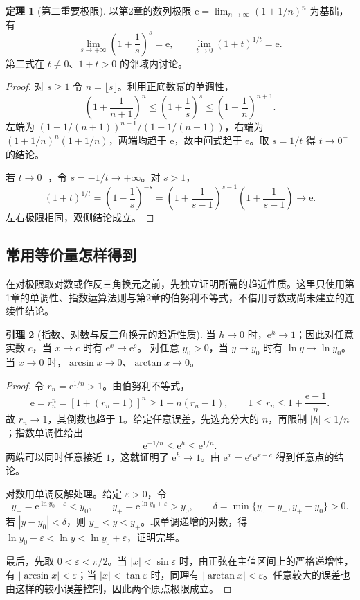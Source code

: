 \documentclass[UTF8,fontset=fandol,12pt,oneside,openany]{ctexrep}
\newcommand{\ee}{\mathrm e}
\theoremstyle{definition}
\newtheorem{theorem}{定理}[chapter]
\newtheorem{lemma}[theorem]{引理}
\begin{document}
\begin{theorem}[第二重要极限]
以第2章的数列极限 $\ee=\lim_{n\to\infty}(1+1/n)^n$ 为基础，有
\[
\lim_{s\to+\infty}\left(1+\frac1s\right)^s=\ee,
\qquad \lim_{t\to0}(1+t)^{1/t}=\ee.
\]
第二式在 $t\ne0$、$1+t>0$ 的邻域内讨论。
\end{theorem}
\begin{proof}
对 $s\ge1$ 令 $n=\lfloor s\rfloor$。利用正底数幂的单调性，
\[
\left(1+\frac1{n+1}\right)^n
\le\left(1+\frac1s\right)^s
\le\left(1+\frac1n\right)^{n+1}.
\]
左端为 $(1+1/(n+1))^{n+1}/(1+1/(n+1))$，右端为 $(1+1/n)^n(1+1/n)$，两端均趋于 $\ee$，故中间式趋于 $\ee$。取 $s=1/t$ 得 $t\to0^+$ 的结论。

若 $t\to0^-$，令 $s=-1/t\to+\infty$。对 $s>1$，
\[
(1+t)^{1/t}=\left(1-\frac1s\right)^{-s}
=\left(1+\frac1{s-1}\right)^{s-1}
 \left(1+\frac1{s-1}\right)\longrightarrow\ee.
\]
左右极限相同，双侧结论成立。
\end{proof}

\subsection{常用等价量怎样得到}
在对极限取对数或作反三角换元之前，先独立证明所需的趋近性质。这里只使用第1章的单调性、指数运算法则与第2章的伯努利不等式，不借用导数或尚未建立的连续性结论。

\begin{lemma}[指数、对数与反三角换元的趋近性质]
\label{lec:03:elementary-approach}
当 $h\to0$ 时，$\ee^h\to1$；因此对任意实数 $c$，当 $x\to c$ 时有 $\ee^x\to\ee^c$。
对任意 $y_0>0$，当 $y\to y_0$ 时有 $\ln y\to\ln y_0$。
当 $x\to0$ 时，$\arcsin x\to0$、$\arctan x\to0$。
\end{lemma}
\begin{proof}
令 $r_n=\ee^{1/n}>1$。由伯努利不等式，
\[
\ee=r_n^n=[1+(r_n-1)]^n\ge1+n(r_n-1),
\qquad 1\le r_n\le1+\frac{\ee-1}{n}.
\]
故 $r_n\to1$，其倒数也趋于 $1$。给定任意误差，先选充分大的 $n$，再限制 $|h|<1/n$；指数单调性给出
\[
\ee^{-1/n}\le\ee^h\le\ee^{1/n}.
\]
两端可以同时任意接近 $1$，这就证明了 $\ee^h\to1$。由 $\ee^x=\ee^c\ee^{x-c}$ 得到任意点的结论。

对数用单调反解处理。给定 $\varepsilon>0$，令
\[
y_-=\ee^{\ln y_0-\varepsilon}<y_0,
\qquad y_+=\ee^{\ln y_0+\varepsilon}>y_0,
\qquad \delta=\min\{y_0-y_-,y_+-y_0\}>0.
\]
若 $|y-y_0|<\delta$，则 $y_-<y<y_+$。取单调递增的对数，得
$\ln y_0-\varepsilon<\ln y<\ln y_0+\varepsilon$，证明完毕。

最后，先取 $0<\varepsilon<\pi/2$。当 $|x|<\sin\varepsilon$ 时，由正弦在主值区间上的严格递增性，有 $|\arcsin x|<\varepsilon$；当 $|x|<\tan\varepsilon$ 时，同理有 $|\arctan x|<\varepsilon$。任意较大的误差也由这样的较小误差控制，因此两个原点极限成立。
\end{proof}
\end{document}
